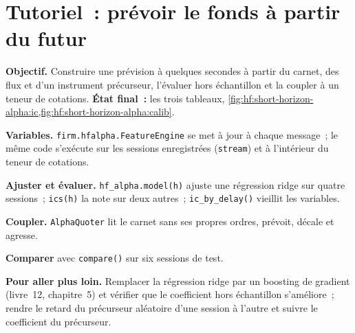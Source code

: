 \section{Tutoriel~: prévoir le fonds à partir du futur}\label{tut:hf:short-horizon-alpha:tut}

\begin{tutorial}
\textbf{Objectif.} Construire une prévision à quelques secondes à partir du carnet, des flux et d'un instrument précurseur, l'évaluer hors échantillon et la coupler à un teneur de cotations.
\textbf{État final~:} les trois tableaux, \cref{fig:hf:short-horizon-alpha:ic,fig:hf:short-horizon-alpha:calib}.
\begin{tutsteps}
\item \textbf{Variables.} \texttt{firm.hfalpha.FeatureEngine} se met à jour à chaque message~; le même code s'exécute sur les sessions enregistrées (\texttt{stream})
et à l'intérieur du teneur de cotations.
\label{lst:hf:short-horizon-alpha:features}
\item \textbf{Ajuster et évaluer.} \texttt{hf\_alpha.model(h)} ajuste une régression ridge sur quatre sessions~; \texttt{ics(h)} la note sur deux autres~;
\texttt{ic\_by\_delay()} vieillit les variables.
\item \textbf{Coupler.} \texttt{AlphaQuoter} lit le carnet sans ses propres ordres, prévoit, décale et agresse.
\label{lst:hf:short-horizon-alpha:quoter}
\item \textbf{Comparer} avec \texttt{compare()} sur six sessions de test.
\end{tutsteps}
\textbf{Pour aller plus loin.} Remplacer la régression ridge par un boosting de gradient (livre~12, chapitre~5) et vérifier que le coefficient hors échantillon
s'améliore~; rendre le retard du précurseur aléatoire d'une session à l'autre et suivre le coefficient du précurseur.
\end{tutorial}

